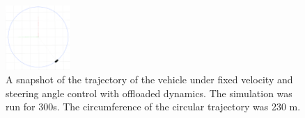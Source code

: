 \documentclass[aps,pra,twocolumn,notitlepage,nofootinbib,superscriptaddress]{revtex4-1}
\begin{document}
\begin{figure}[htpb]
\centering
\includegraphics[angle=0,origin=c,trim={0.0cm 0.0cm 0.0cm 0.0cm},clip,width=0.22\textwidth]{rviz_screenshot_sparkle_8ms.png}
\caption{A snapshot of the trajectory of the vehicle under fixed velocity and steering angle control with offloaded dynamics. The simulation was run for 300s. The circumference of the circular trajectory was 230 m.}
\label{fig:rviz_screenshot_sparkle_8ms}
\end{figure}
\end{document}
